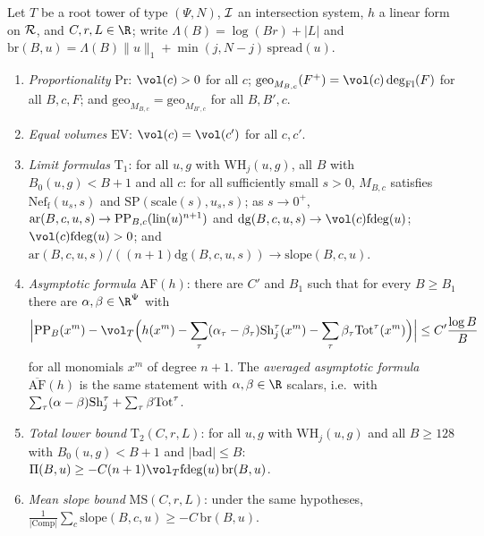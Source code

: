 \begin{definition}\label{pf:volthm:def:conclusions}
Let $T$ be a root tower of type $(\Psi,N)$, $\mathcal{I}$ an intersection system, $h$ a linear form on
$\mathcal{R}$, and $C,r,L\in\R$; write $\Lambda(B)=\log(Br)+|L|$ and
$\mathrm{br}(B,u)=\Lambda(B)\|u\|_1+\min(j,N-j)\,\mathrm{spread}(u)$.
\begin{enumerate}[label=(\alph*)]
\item \emph{Proportionality} $\mathrm{Pr}$: $\vol(c)>0$ for all $c$; $\mathrm{geo}_{M_{B,c}}(F^+)=\vol(c)\volthmdeg(F)$ for
  all $B,c,F$; and $\mathrm{geo}_{M_{B,c}}=\mathrm{geo}_{M_{B',c}}$ for all $B,B',c$.
\item \emph{Equal volumes} $\mathrm{EV}$: $\vol(c)=\vol(c')$ for all $c,c'$.
\item \emph{Limit formulas} $\mathrm{T}_1$: for all $u,g$ with $\mathrm{WH}_j(u,g)$, all $B$ with $B_0(u,g)<B+1$ and all $c$: for
  all sufficiently small $s>0$, $M_{B,c}$ satisfies $\mathrm{Nef}_{\mathrm f}(u_s,s)$ and
  $\mathrm{SP}(\mathrm{scale}(s),u_s,s)$; as $s\to0^+$,
  $\mathrm{ar}(B,c,u,s)\to\mathrm{PP}_{B,c}(\mathrm{lin}(u)^{n+1})$ and $\mathrm{dg}(B,c,u,s)\to\vol(c)\volthmfd(u)$;
  $\vol(c)\volthmfd(u)>0$; and $\mathrm{ar}(B,c,u,s)/((n+1)\mathrm{dg}(B,c,u,s))\to\mathrm{slope}(B,c,u)$.
\item \emph{Asymptotic formula} $\mathrm{AF}(h)$: there are $C'$ and $B_1$ such that for every $B\ge B_1$ there are
  $\alpha,\beta\in\R^\Psi$ with
  \[
  \Bigl|\volthmPP_B(x^m)-\vol_T\Bigl(h(x^m)-\sum_\tau(\alpha_\tau-\beta_\tau)\volthmSh_j^\tau(x^m)-
  \sum_\tau\beta_\tau\volthmTot^\tau(x^m)\Bigr)\Bigr|\le C'\frac{\log B}{B}
  \]
  for all monomials $x^m$ of degree $n+1$. The \emph{averaged asymptotic formula} $\overline{\mathrm{AF}}(h)$ is the
  same statement with $\alpha,\beta\in\R$
  scalars, i.e.\ with $\sum_\tau(\alpha-\beta)\mathrm{Sh}_j^\tau+\sum_\tau\beta\mathrm{Tot}^\tau$.
\item \emph{Total lower bound} $\mathrm{T}_2(C,r,L)$: for all $u,g$ with $\mathrm{WH}_j(u,g)$ and all $B\ge128$ with $B_0(u,g)<B+1$
  and $|\mathrm{bad}|\le B$:
  $\Pi(B,u)\ge-C(n+1)\vol_T\volthmfd(u)\,\mathrm{br}(B,u)$.
\item \emph{Mean slope bound} $\mathrm{MS}(C,r,L)$: under the same hypotheses,
  $\frac1{|\mathrm{Comp}|}\sum_c\mathrm{slope}(B,c,u)\ge-C\,\mathrm{br}(B,u)$.
\end{enumerate}
\end{definition}

